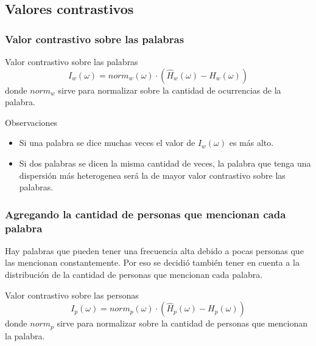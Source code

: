 \subsection{Valores contrastivos}
\begin{frame}[t]\frametitle{Valor contrastivo sobre las palabras}
    \begin{alertblock}{Valor contrastivo sobre las palabras}
        \begin{equation}
            I_w(\omega) = norm_{w}(\omega) \cdot (\widehat{H}_{w}(\omega) - H_{w}(\omega))
            \label{eq:iw}
        \end{equation}
        donde $norm_w$ sirve para normalizar sobre la cantidad de ocurrencias de la palabra.
    \end{alertblock}

    \begin{block}{Observaciones}
        \begin{itemize}
            \item Si una palabra se dice muchas veces el valor de $I_w(\omega)$ es más alto.
            \item Si dos palabras se dicen la misma cantidad de veces, la palabra que tenga una dispersión más heterogenea será la de mayor valor contrastivo sobre las palabras.
        \end{itemize}
    \end{block}

\end{frame}

\begin{frame}[t]\frametitle{Agregando la cantidad de personas que mencionan cada palabra}
    Hay palabras que pueden tener una frecuencia alta debido a pocas personas que las mencionan constantemente. Por eso se decidió también tener en cuenta a la distribución de la cantidad de personas que mencionan cada palabra.

    \begin{alertblock}{Valor contrastivo sobre las personas}
        \begin{equation}
            I_p(\omega) = norm_p(\omega) \cdot (\widehat{H}_p(\omega) - H_p(\omega))
            \label{eq:iu}
        \end{equation}
        donde $norm_p$ sirve para normalizar sobre la cantidad de personas que mencionan la palabra.
    \end{alertblock}


\end{frame}


